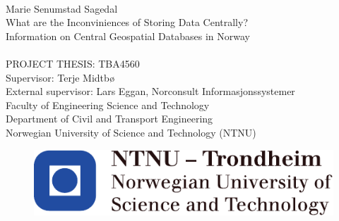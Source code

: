 \thispagestyle{empty}
\mbox{}\\[6pc]

\noindent\Large{Marie Senumstad Sagedal}\\[4pc]
\Huge{What are the Inconviniences of Storing Data Centrally?}\\[1pc]
\Large{Information on Central Geospatial Databases in Norway}\\[5pc]
\\[2pc]
PROJECT THESIS: TBA4560\\
\large{Supervisor: Terje Midtbø }\\%
\large{External supervisor: Lars Eggan, Norconsult Informasjonssystemer}\\[2pc]
Faculty of Engineering Science and Technology\\
Department of Civil and Transport Engineering\\
Norwegian University of Science and Technology (NTNU)
\begin{figure}[b!]
   \includegraphics[scale=1.0]{img/NTNU}
\end{figure}

\vfill



